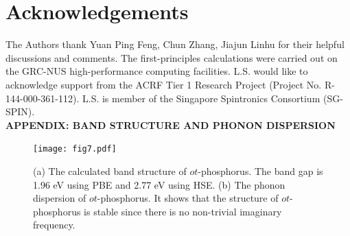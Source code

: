 \documentclass[%
superscriptaddress,
preprint,
showpacs,preprintnumbers,
 amsmath,amssymb,
prb,
]{revtex4-1}
\begin{document}
\section{Acknowledgements}

The Authors thank Yuan Ping Feng, Chun Zhang, Jiajun Linhu for their helpful discussions and comments. The first-principles calculations were carried out on the GRC-NUS high-performance computing facilities. L.S. would like to acknowledge support from the ACRF Tier 1 Research Project (Project No. R-144-000-361-112). L.S. is member of the Singapore Spintronics Consortium (SG-SPIN). \\

\textbf{APPENDIX: BAND STRUCTURE AND PHONON DISPERSION}
\begin{figure}[ptb]
\centering
\texttt{[image: fig7.pdf]}
\caption{{\footnotesize{} (a) The calculated band structure of $ot$-phosphorus. The band gap is 1.96 eV using PBE and 2.77 eV using HSE. (b) The phonon dispersion of $ot$-phosphorus. It shows that the structure of $ot$-phosphorus is stable since there is no non-trivial imaginary frequency. \label{fig:T-dependent-C}}}
\end{figure}

\centering
\end{document}
